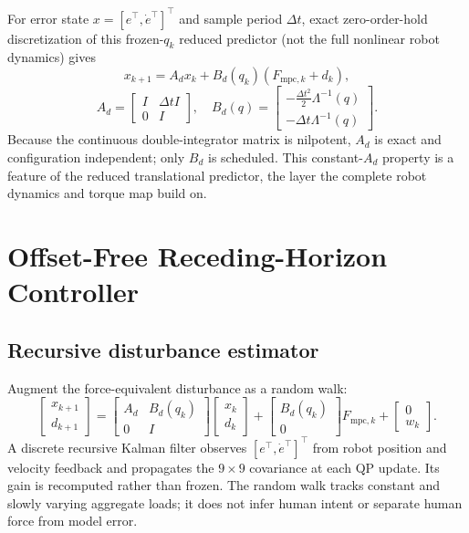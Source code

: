 \documentclass[conference]{IEEEtran}
\begin{document}
For error state $x=[e^\top,\dot e^\top]^\top$ and sample period $\Delta t$,
exact zero-order-hold discretization of this frozen-$q_k$ reduced predictor
(not the full nonlinear robot dynamics) gives
\begin{equation}
x_{k+1}=A_dx_k+B_d(q_k)(F_{\mathrm{mpc},k}+d_k),
\label{eq:discrete}
\end{equation}
\begin{equation}
A_d=\begin{bmatrix}I&\Delta t I\\0&I\end{bmatrix},\quad
B_d(q)=\begin{bmatrix}-\frac{\Delta t^2}{2}\Lambda^{-1}(q)\\
-\Delta t\Lambda^{-1}(q)\end{bmatrix}.
\label{eq:AB}
\end{equation}
Because the continuous double-integrator matrix is nilpotent, $A_d$ is exact
and configuration independent; only $B_d$ is scheduled. This constant-$A_d$
property is a feature of the reduced translational predictor, the layer
the complete robot dynamics and torque map build on.

\section{Offset-Free Receding-Horizon Controller}

\subsection{Recursive disturbance estimator}

Augment the force-equivalent disturbance as a random walk:
\begin{equation}
\begin{bmatrix}x_{k+1}\\d_{k+1}\end{bmatrix}=
\begin{bmatrix}A_d&B_d(q_k)\\0&I\end{bmatrix}
\begin{bmatrix}x_k\\d_k\end{bmatrix}+
\begin{bmatrix}B_d(q_k)\\0\end{bmatrix}F_{\mathrm{mpc},k}+
\begin{bmatrix}0\\w_k\end{bmatrix}.
\label{eq:augmented}
\end{equation}
A discrete recursive Kalman filter observes $[e^\top,\dot e^\top]^\top$ from
robot position and velocity feedback and propagates the $9\times9$
covariance at each QP update. Its gain is recomputed rather than frozen.
The random walk tracks constant and slowly varying aggregate loads; it does
not infer human intent or separate human force from model error.
\end{document}
